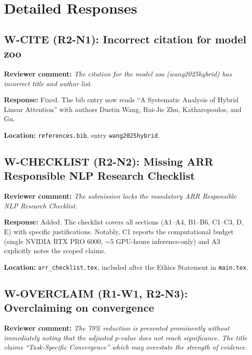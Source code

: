 \documentclass[11pt]{article}
\newcommand{\reviewer}[1]{\textcolor{reviewercolor}{\textbf{Reviewer comment:} \textit{#1}}}
\newcommand{\response}[1]{\textcolor{responsecolor}{\textbf{Response:} #1}}
\newcommand{\location}[1]{\textbf{Location:} #1}
\begin{document}
\section*{Detailed Responses}

\subsection*{W-CITE (R2-N1): Incorrect citation for model zoo}

\reviewer{The citation for the model zoo (wang2025hybrid) has incorrect title and author list.}

\response{Fixed. The bib entry now reads ``A Systematic Analysis of Hybrid Linear Attention'' with authors Dustin Wang, Rui-Jie Zhu, Katharopoulos, and Gu.}

\location{\texttt{references.bib}, entry \texttt{wang2025hybrid}.}

\subsection*{W-CHECKLIST (R2-N2): Missing ARR Responsible NLP Research Checklist}

\reviewer{The submission lacks the mandatory ARR Responsible NLP Research Checklist.}

\response{Added. The checklist covers all sections (A1--A4, B1--B6, C1--C3, D, E) with specific justifications. Notably, C1 reports the computational budget (single NVIDIA RTX PRO 6000, $\sim$5 GPU-hours inference-only) and A3 explicitly notes the scoped claims.}

\location{\texttt{arr\_checklist.tex}, included after the Ethics Statement in \texttt{main.tex}.}

\subsection*{W-OVERCLAIM (R1-W1, R2-N3): Overclaiming on convergence}

\reviewer{The 79\% reduction is presented prominently without immediately noting that the adjusted p-value does not reach significance. The title claims ``Task-Specific Convergence'' which may overstate the strength of evidence.}
\end{document}
